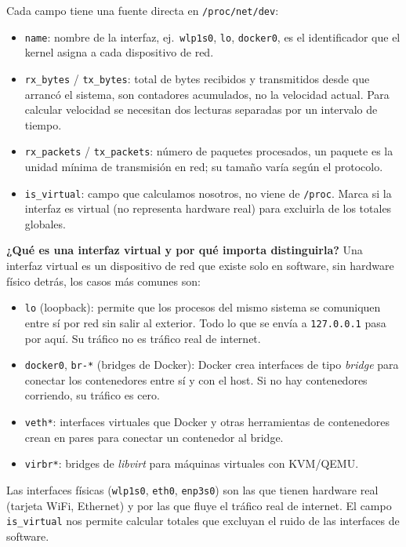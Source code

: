 \documentclass[12pt,letterpaper]{article}
\begin{document}
Cada campo tiene una fuente directa en \texttt{/proc/net/dev}:

\begin{itemize}[leftmargin=1.5cm]
\item \texttt{name}: nombre de la interfaz, ej.\ \texttt{wlp1s0}, \texttt{lo}, \texttt{docker0}, es el
  identificador que el kernel asigna a cada dispositivo de red.
\item \texttt{rx\_bytes} / \texttt{tx\_bytes}: total de bytes recibidos y transmitidos desde que arrancó el
  sistema, son contadores acumulados, no la velocidad actual. Para calcular velocidad se necesitan dos lecturas
  separadas por un intervalo de tiempo.
\item \texttt{rx\_packets} / \texttt{tx\_packets}: número de paquetes procesados, un paquete es la unidad mínima
  de transmisión en red; su tamaño varía según el protocolo.
\item \texttt{is\_virtual}: campo que calculamos nosotros, no viene de \texttt{/proc}. Marca si la interfaz es
  virtual (no representa hardware real) para excluirla de los totales globales.
\end{itemize}

\medskip

\textbf{¿Qué es una interfaz virtual y por qué importa distinguirla?}
Una interfaz virtual es un dispositivo de red que existe solo en software, sin hardware físico detrás, los casos
más comunes son:
\begin{itemize}[leftmargin=1.5cm]
\item \texttt{lo} (loopback): permite que los procesos del mismo sistema se comuniquen entre sí por red sin salir
  al exterior. Todo lo que se envía a \texttt{127.0.0.1} pasa por aquí. Su tráfico no es tráfico real de
  internet.
\item \texttt{docker0}, \texttt{br-*} (bridges de Docker): Docker crea interfaces de tipo \textit{bridge} para
  conectar los contenedores entre sí y con el host. Si no hay contenedores corriendo, su tráfico es cero.
\item \texttt{veth*}: interfaces virtuales que Docker y otras herramientas de contenedores crean en pares para
  conectar un contenedor al bridge.
\item \texttt{virbr*}: bridges de \textit{libvirt} para máquinas virtuales con KVM/QEMU.
\end{itemize}

Las interfaces físicas (\texttt{wlp1s0}, \texttt{eth0}, \texttt{enp3s0}) son las que tienen hardware real
(tarjeta WiFi, Ethernet) y por las que fluye el tráfico real de internet. El campo \texttt{is\_virtual} nos
permite calcular totales que excluyan el ruido de las interfaces de software.
\end{document}
